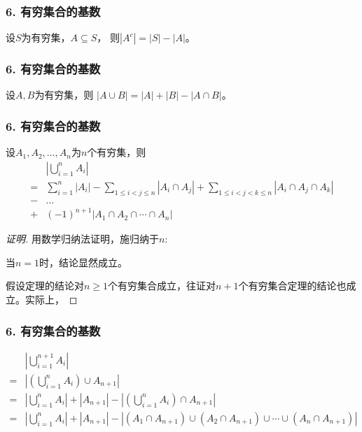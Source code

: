 \documentclass{beamer}
\begin{document}
\begin{CJK*}{UTF8}{gbsn}
\begin{frame}
\frametitle{6. 有穷集合的基数}
\begin{Thm}
  设$S$为有穷集，$A \subseteq S$， 则$|A^c| = |S| - |A|$。
\end{Thm}
\end{frame}

\begin{frame}
\frametitle{6. 有穷集合的基数}
\begin{Thm}
  设$A,B$为有穷集，则
$|A \cup B| = |A| + |B| - |A \cap B|$。
\end{Thm}\pause
\end{frame}
\begin{frame}
  \frametitle{6. 有穷集合的基数}
\begin{Thm}
  设$A_1, A_2, \ldots, A_n$为$n$个有穷集，则
  \begin{equation*}
\begin{split}
    &|\bigcup_{i=1}^nA_i|\\
=&\sum_{i=1}^n|A_i| - \sum_{1\leq i < j \leq n}|A_i \cap A_j| + \sum_{1 \leq  i < j < k \leq n}|A_i \cap A_j \cap A_k|\\
-&\ldots\\
+&(-1)^{n+1}|A_1 \cap A_2 \cap \cdots \cap A_n| 
  \end{split}
\end{equation*}
\end{Thm}
\begin{proof}[证明]
  \pause 用数学归纳法证明，施归纳于$n$:

  \pause 当$n=1$时，结论显然成立。

  \pause 假设定理的结论对$n \geq 1$个有穷集合成立，往证对$n+1$个有穷集合定理的结论也成立。实际上，
  \renewcommand{\qedsymbol}{}
\end{proof}
\end{frame}

\begin{frame}
  \frametitle{6. 有穷集合的基数}
  \begin{equation}\label{eq1}
    \begin{split}
      &|\bigcup_{i=1}^{n+1}A_i|\\
      =&|(\bigcup_{i=1}^nA_i) \cup A_{n+1}|\\
      =&|\bigcup_{i=1}^nA_i| + |A_{n+1}| - |(\bigcup_{i=1}^nA_i) \cap A_{n+1}|\\
      =&|\bigcup_{i=1}^nA_i| + |A_{n+1}| - |(A_1 \cap A_{n+1}) \cup (A_2 \cap A_{n+1}) \cup \cdots \cup (A_n \cap A_{n+1})|
    \end{split}
  \end{equation}
  

\end{frame}
\end{CJK*}
\end{document}
